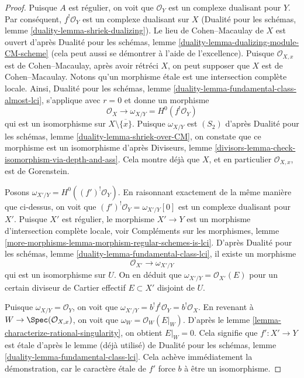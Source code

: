 \begin{proof}
\medskip\noindent
Puisque $A$ est régulier, on voit que $\mathcal{O}_Y$ est un complexe dualisant pour $Y$.
Par conséquent, $f^!\mathcal{O}_Y$ est un complexe dualisant sur $X$
(Dualité pour les schémas, lemme \ref{duality-lemma-shriek-dualizing}).
Le lieu de Cohen--Macaulay de $X$ est ouvert d'après
Dualité pour les schémas, lemme \ref{duality-lemma-dualizing-module-CM-scheme}
(cela peut aussi se démontrer à l'aide de l'excellence).
Puisque $\mathcal{O}_{X, x}$ est de Cohen--Macaulay, après avoir rétréci
$X$, on peut supposer que $X$ est de Cohen--Macaulay.
Notons qu'un morphisme \'etale est une intersection complète locale.
Ainsi,
Dualité pour les schémas, lemme \ref{duality-lemma-fundamental-class-almost-lci},
s'applique avec $r = 0$ et donne un morphisme
$$
\mathcal{O}_X \longrightarrow \omega_{X/Y} = H^0(f^!\mathcal{O}_Y)
$$
qui est un isomorphisme sur $X \setminus \overline{\{x\}}$.
Puisque $\omega_{X/Y}$ est $(S_2)$ d'après
Dualité pour les schémas, lemme \ref{duality-lemma-shriek-over-CM},
on constate que ce morphisme est un isomorphisme d'après
Diviseurs, lemme \ref{divisors-lemma-check-isomorphism-via-depth-and-ass}.
Cela montre déjà que $X$, et en particulier $\mathcal{O}_{X, x}$, est
de Gorenstein.

\medskip\noindent
Posons $\omega_{X'/Y} = H^0((f')^!\mathcal{O}_Y)$. En raisonnant exactement de la
même manière que ci-dessus, on voit que $(f')^!\mathcal{O}_Y = \omega_{X'/Y}[0]$
est un complexe dualisant pour $X'$. Puisque $X'$ est régulier,
le morphisme $X' \to Y$ est un morphisme d'intersection complète locale, voir
Compléments sur les morphismes, lemme
\ref{more-morphisms-lemma-morphism-regular-schemes-is-lci}.
D'après Dualité pour les schémas, lemme \ref{duality-lemma-fundamental-class-lci},
il existe un morphisme
$$
\mathcal{O}_{X'} \longrightarrow \omega_{X'/Y}
$$
qui est un isomorphisme sur $U$. On en déduit que
$\omega_{X'/Y} = \mathcal{O}_{X'}(E)$ pour un certain diviseur de
Cartier effectif $E \subset X'$ disjoint de $U$.

\medskip\noindent
Puisque $\omega_{X/Y} = \mathcal{O}_Y$, on voit que
$\omega_{X'/Y} = b^! f^!\mathcal{O}_Y = b^!\mathcal{O}_X$.
En revenant à $W \to \Spec(\mathcal{O}_{X, x})$,
on voit que $\omega_W = \mathcal{O}_W(E|_W)$.
D'après le lemme \ref{lemma-characterize-rational-singularity},
on obtient $E|_W = 0$.
Cela signifie que $f' : X' \to Y$ est \'etale d'après le lemme (déjà utilisé)
de Dualité pour les schémas, lemme \ref{duality-lemma-fundamental-class-lci}.
Cela achève immédiatement la démonstration, car le caractère \'etale
de $f'$ force $b$ à être un isomorphisme.
\end{proof}

